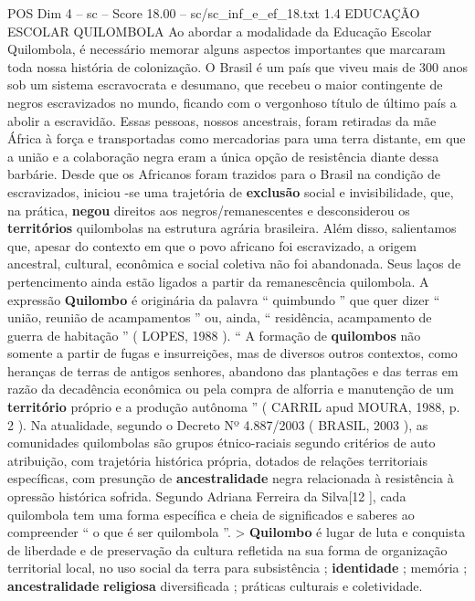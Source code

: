 \begin{textsample}{POS Dim 4 – sc – Score 18.00 – sc/sc\_inf\_e\_ef\_18.txt}  \label{ex:f4_pos_037}
1.4 EDUCAÇÃO ESCOLAR QUILOMBOLA Ao abordar a modalidade da Educação Escolar Quilombola, é necessário memorar alguns aspectos importantes que marcaram toda nossa história de colonização.
O Brasil é um país que viveu mais de 300 anos sob um sistema escravocrata e desumano, que recebeu o maior contingente de negros escravizados no mundo, ficando com o vergonhoso título de último país a abolir a escravidão.
Essas pessoas, nossos ancestrais, foram retiradas da mãe África à força e transportadas como mercadorias para uma terra distante, em que a união e a colaboração negra eram a única opção de resistência diante dessa barbárie.
Desde que os Africanos foram trazidos para o Brasil na condição de escravizados, iniciou -se uma trajetória de \textbf{exclusão} social e invisibilidade, que, na prática, \textbf{negou} direitos aos negros/remanescentes e desconsiderou os \textbf{territórios} quilombolas na estrutura agrária brasileira.
Além disso, salientamos que, apesar do contexto em que o povo africano foi escravizado, a origem ancestral, cultural, econômica e social coletiva não foi abandonada.
Seus laços de pertencimento ainda estão ligados a partir da remanescência quilombola.
A expressão \textbf{Quilombo} é originária da palavra “ quimbundo ” que quer dizer “ união, reunião de acampamentos ” ou, ainda, “ residência, acampamento de guerra de habitação ” ( LOPES, 1988 ). “ A formação de \textbf{quilombos} não somente a partir de fugas e insurreições, mas de diversos outros contextos, como heranças de terras de antigos senhores, abandono das plantações e das terras em razão da decadência econômica ou pela compra de alforria e manutenção de um \textbf{território} próprio e a produção autônoma ” ( CARRIL apud MOURA, 1988, p. 2 ).
Na atualidade, segundo o Decreto Nº 4.887/2003 ( BRASIL, 2003 ), as comunidades quilombolas são grupos étnico-raciais segundo critérios de auto atribuição, com trajetória histórica própria, dotados de relações territoriais específicas, com presunção de \textbf{ancestralidade} negra relacionada à resistência à opressão histórica sofrida.
Segundo Adriana Ferreira da Silva[12 ], cada quilombola tem uma forma específica e cheia de significados e saberes ao compreender “ o que é ser quilombola ”. > \textbf{Quilombo} é lugar de luta e conquista de liberdade e de preservação da cultura refletida na sua forma de organização territorial local, no uso social da terra para subsistência ; \textbf{identidade} ; memória ; \textbf{ancestralidade} \textbf{religiosa} diversificada ; práticas culturais e coletividade.

\end{textsample}
